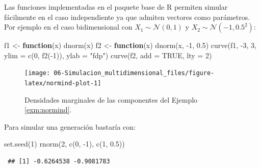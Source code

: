\documentclass[
]{book}
\newenvironment{Shaded}{\begin{snugshade}}{\end{snugshade}}
\newcommand{\AttributeTok}[1]{\textcolor[rgb]{0.77,0.63,0.00}{#1}}
\newcommand{\ConstantTok}[1]{\textcolor[rgb]{0.00,0.00,0.00}{#1}}
\newcommand{\ControlFlowTok}[1]{\textcolor[rgb]{0.13,0.29,0.53}{\textbf{#1}}}
\newcommand{\DecValTok}[1]{\textcolor[rgb]{0.00,0.00,0.81}{#1}}
\newcommand{\FloatTok}[1]{\textcolor[rgb]{0.00,0.00,0.81}{#1}}
\newcommand{\FunctionTok}[1]{\textcolor[rgb]{0.00,0.00,0.00}{#1}}
\newcommand{\NormalTok}[1]{#1}
\newcommand{\OtherTok}[1]{\textcolor[rgb]{0.56,0.35,0.01}{#1}}
\newcommand{\SpecialCharTok}[1]{\textcolor[rgb]{0.00,0.00,0.00}{#1}}
\newcommand{\StringTok}[1]{\textcolor[rgb]{0.31,0.60,0.02}{#1}}
\theoremstyle{break}
\theoremstyle{nonumberplain}
\begin{document}
Las funciones implementadas en el paquete base de R permiten simular fácilmente en el caso independiente ya que admiten vectores como parámetros.
Por ejemplo en el caso bidimensional con \(X_1 \sim \mathcal{N}\left( 0, 1\right)\) y \(X_2 \sim \mathcal{N}\left( -1, 0.5^2 \right)\):



\begin{Shaded}
\begin{Highlighting}[]
\NormalTok{f1 }\OtherTok{\textless{}{-}} \ControlFlowTok{function}\NormalTok{(x) }\FunctionTok{dnorm}\NormalTok{(x)}
\NormalTok{f2 }\OtherTok{\textless{}{-}} \ControlFlowTok{function}\NormalTok{(x) }\FunctionTok{dnorm}\NormalTok{(x, }\SpecialCharTok{{-}}\DecValTok{1}\NormalTok{, }\FloatTok{0.5}\NormalTok{)}
\FunctionTok{curve}\NormalTok{(f1, }\SpecialCharTok{{-}}\DecValTok{3}\NormalTok{, }\DecValTok{3}\NormalTok{, }\AttributeTok{ylim =} \FunctionTok{c}\NormalTok{(}\DecValTok{0}\NormalTok{, }\FunctionTok{f2}\NormalTok{(}\SpecialCharTok{{-}}\DecValTok{1}\NormalTok{)), }\AttributeTok{ylab =} \StringTok{"fdp"}\NormalTok{)}
\FunctionTok{curve}\NormalTok{(f2, }\AttributeTok{add =} \ConstantTok{TRUE}\NormalTok{, }\AttributeTok{lty =} \DecValTok{2}\NormalTok{)}
\end{Highlighting}
\end{Shaded}

\begin{figure}[!htb]

{\centering \texttt{[image: 06-Simulacion\_multidimensional\_files/figure-latex/normind-plot-1]} 

}

\caption{Densidades marginales de las componentes del Ejemplo \ref{exm:normind}.}\label{fig:normind-plot}
\end{figure}

Para simular una generación bastaría con:

\begin{Shaded}
\begin{Highlighting}[]
\FunctionTok{set.seed}\NormalTok{(}\DecValTok{1}\NormalTok{)}
\FunctionTok{rnorm}\NormalTok{(}\DecValTok{2}\NormalTok{, }\FunctionTok{c}\NormalTok{(}\DecValTok{0}\NormalTok{, }\SpecialCharTok{{-}}\DecValTok{1}\NormalTok{), }\FunctionTok{c}\NormalTok{(}\DecValTok{1}\NormalTok{, }\FloatTok{0.5}\NormalTok{))}
\end{Highlighting}
\end{Shaded}

\begin{verbatim}
 ## [1] -0.6264538 -0.9081783
\end{verbatim}
\end{document}
